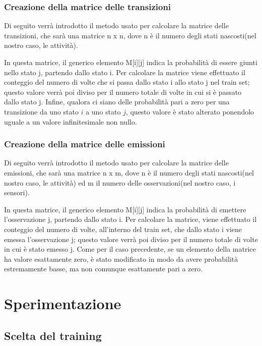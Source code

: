 \documentclass[10pt,a4paper]{article}
\begin{document}
	\subsubsection{Creazione della matrice delle transizioni}
	Di seguito verrà introdotto il metodo usato per calcolare la matrice delle transizioni, che sarà una matrice  n x n, dove n è il numero degli stati nascosti(nel nostro caso, le attività).
	
	In questa matrice, il generico elemento M[i][j] indica la probabilità di essere giunti nello stato j, partendo dallo stato i. Per calcolare la matrice viene effettuato il conteggio del numero di volte che si passa dallo stato i allo stato j nel train set; questo valore verrà poi diviso per il numero totale di volte in cui si è passato dallo stato j. Infine, qualora ci siano delle probabilità pari a zero per una transizione da uno stato $i$ a uno stato $j$, questo valore è stato alterato ponendolo uguale a un valore infinitesimale non nullo.
	
	\subsubsection{Creazione della matrice delle emissioni}
	Di seguito verrà introdotto il metodo usato per calcolare la matrice delle emissioni, che sarà una matrice  n x m, dove n è il numero degli stati nascosti(nel nostro caso, le attività) ed m il numero delle osservazioni(nel nostro caso, i sensori).
	
	In questa matrice, il generico elemento M[i][j] indica la probabilità di emettere l'osservazione j, partendo dallo stato i. Per calcolare la matrice, viene effettuato il conteggio del numero di volte, all'interno del train set, che dallo stato i viene emessa l'osservazione j; questo valore verrà poi diviso per il numero totale di volte in cui è stato emesso j. Come per il caso precedente, se un elemento della matrice ha valore esattamente zero, è stato modificato in modo da avere probabilità estremamente basse, ma non comunque esattamente pari a zero.
	
	\section{Sperimentazione}
	
	\subsection{Scelta del training}
		
\end{document}
